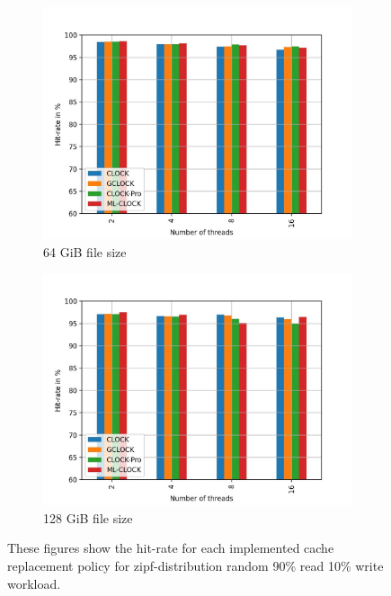 \documentclass[
	12pt,
	a4paper,
	abstract,
	bibliography=totoc,
	chapterprefix,
	headings=openright,
	numbers=endperiod,
	parskip=half,
	twoside,
]{scrreprt}
\begin{document}
\begin{figure}[H]
\begin{subfigure}{0.4\textwidth}
		\includegraphics[width=\textwidth]{multi_64_gb_rw_90to10_zipf.jpg}		
		\caption{64 GiB file size}
		\label{fig:rw_90to10  zoned}
	\end{subfigure}
	\hfill
	\begin{subfigure}{0.4\textwidth}
		\includegraphics[width=\textwidth]{multi_128_gb_rw_90to10_zipf.jpg}		
		\caption{128 GiB file size}
		\label{fig:rw_90to10  uniform}
	\end{subfigure}
	\caption{These figures show the hit-rate for each implemented cache replacement policy for zipf-distribution random 90\% read 10\% write workload.}
\end{figure}
\end{document}
